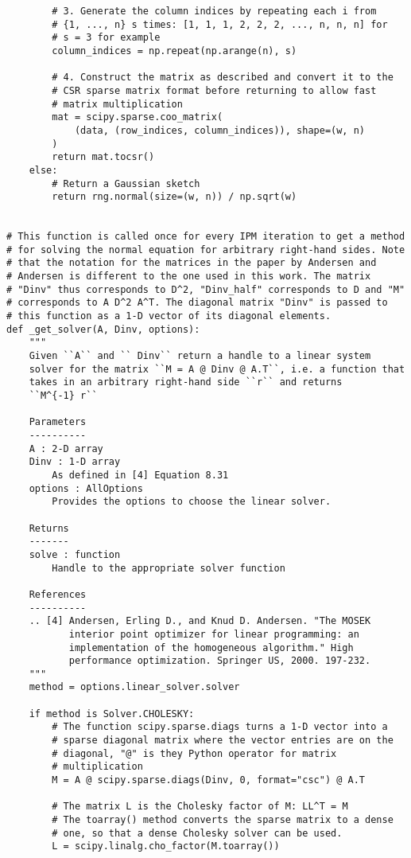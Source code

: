 \begin{verbatim}
        # 3. Generate the column indices by repeating each i from
        # {1, ..., n} s times: [1, 1, 1, 2, 2, 2, ..., n, n, n] for
        # s = 3 for example
        column_indices = np.repeat(np.arange(n), s)

        # 4. Construct the matrix as described and convert it to the
        # CSR sparse matrix format before returning to allow fast
        # matrix multiplication
        mat = scipy.sparse.coo_matrix(
            (data, (row_indices, column_indices)), shape=(w, n)
        )
        return mat.tocsr()
    else:
        # Return a Gaussian sketch
        return rng.normal(size=(w, n)) / np.sqrt(w)


# This function is called once for every IPM iteration to get a method
# for solving the normal equation for arbitrary right-hand sides. Note
# that the notation for the matrices in the paper by Andersen and
# Andersen is different to the one used in this work. The matrix
# "Dinv" thus corresponds to D^2, "Dinv_half" corresponds to D and "M"
# corresponds to A D^2 A^T. The diagonal matrix "Dinv" is passed to
# this function as a 1-D vector of its diagonal elements.
def _get_solver(A, Dinv, options):
    """
    Given ``A`` and `` Dinv`` return a handle to a linear system
    solver for the matrix ``M = A @ Dinv @ A.T``, i.e. a function that
    takes in an arbitrary right-hand side ``r`` and returns
    ``M^{-1} r``

    Parameters
    ----------
    A : 2-D array
    Dinv : 1-D array
        As defined in [4] Equation 8.31
    options : AllOptions
        Provides the options to choose the linear solver.

    Returns
    -------
    solve : function
        Handle to the appropriate solver function

    References
    ----------
    .. [4] Andersen, Erling D., and Knud D. Andersen. "The MOSEK
           interior point optimizer for linear programming: an
           implementation of the homogeneous algorithm." High
           performance optimization. Springer US, 2000. 197-232.
    """
    method = options.linear_solver.solver

    if method is Solver.CHOLESKY:
        # The function scipy.sparse.diags turns a 1-D vector into a
        # sparse diagonal matrix where the vector entries are on the
        # diagonal, "@" is they Python operator for matrix
        # multiplication
        M = A @ scipy.sparse.diags(Dinv, 0, format="csc") @ A.T

        # The matrix L is the Cholesky factor of M: LL^T = M
        # The toarray() method converts the sparse matrix to a dense
        # one, so that a dense Cholesky solver can be used.
        L = scipy.linalg.cho_factor(M.toarray())


\end{verbatim}
